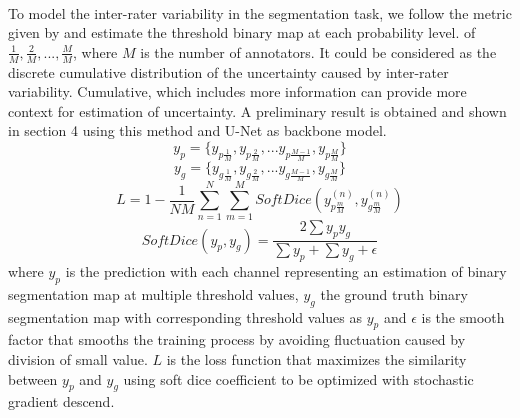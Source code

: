 \documentclass[12pt]{extarticle}
\begin{document}
\paragraph{}
To model the inter-rater variability in the segmentation task, 
we follow the metric given by \cite{qubiq} and estimate the threshold binary map at each probability level.
of $\frac{1}{M}, \frac{2}{M}, ..., \frac{M}{M}$, 
where $M$ is the number of annotators. It could be considered as the discrete cumulative distribution of 
the uncertainty caused by inter-rater variability. Cumulative, which includes more information can 
provide more context for estimation of uncertainty. A preliminary result is obtained and  
shown in section 4 using this method and U-Net as backbone model.
\begin{equation}
    y_{p} = \{y_{p\frac{1}{M}}, y_{p\frac{2}{M}}, ... y_{p\frac{M-1}{M}},y_{p\frac{M}{M}}\}
\end{equation}
\begin{equation}
    y_{g} = \{y_{g\frac{1}{M}}, y_{g\frac{2}{M}}, ... y_{g\frac{M-1}{M}},y_{g\frac{M}{M}}\}
\end{equation}
\begin{equation}
    L = 1 - \frac{1}{NM}\sum_{n=1}^{N}\sum_{m=1}^{M}SoftDice(y_{p\frac{m}{M}}^{(n)}, y_{g\frac{m}{M}}^{(n)})
\end{equation}
\begin{equation}
    SoftDice(y_p, y_g) = \frac{2\sum y_p y_g}{\sum y_p +  \sum y_g + \epsilon}
\end{equation}
where $y_p$ is the prediction with each
channel representing an estimation of binary segmentation map at multiple threshold values, 
$y_g$ the ground truth binary segmentation map with corresponding threshold 
values as $y_p$ and $\epsilon$ is the smooth factor that smooths 
the training process by avoiding fluctuation caused by division of small value.
$L$ is the loss function that maximizes the similarity 
between $y_p$ and $y_g$ using soft dice coefficient 
to be optimized with stochastic gradient descend. 
\end{document}
